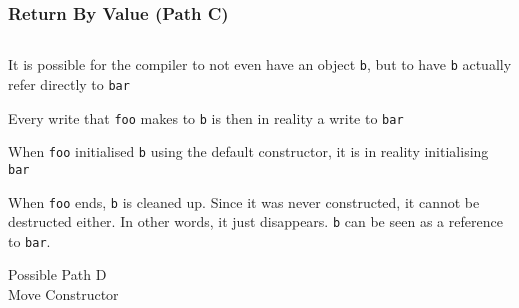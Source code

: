 \begin{frame}
  \frametitle{Return By Value (Path C)}
  \begin{center}
    \begin{columns}
      \column{4cm}
      \column{4cm}
    \end{columns}
  \end{center}
  \vskip2mm
  \begin{overprint}
    \begin{center}
      It is possible for the compiler to not even
      have an object {\tt b}, but to have
      {\tt b} actually refer directly to {\tt bar}
    \end{center}

    \begin{center}
      Every write that {\tt foo} makes to {\tt b}
      is then in reality a write to {\tt bar}
    \end{center}

    \begin{center}
      When {\tt foo} initialised {\tt b} using the default constructor,
      it is in reality initialising {\tt bar}
    \end{center}

    \begin{center}
      When {\tt foo} ends, {\tt b} is cleaned up.
      Since it was never constructed, it cannot be destructed either.
      In other words, it just disappears. {\tt b} can be seen as a reference to {\tt bar}.
    \end{center}
  \end{overprint}
\end{frame}

\begin{frame}
  \begin{center} \Huge
    Possible Path D \\[4mm]
    Move Constructor
  \end{center}
\end{frame}

